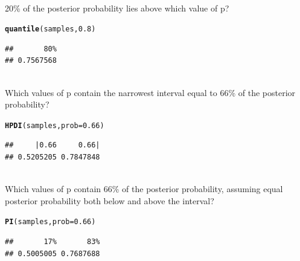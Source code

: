 \documentclass[12pt]{article}\usepackage[]{graphicx}\usepackage[]{color}
\makeatletter
\newcommand{\hlnum}[1]{\textcolor[rgb]{0.686,0.059,0.569}{#1}}%
\newcommand{\hlstd}[1]{\textcolor[rgb]{0.345,0.345,0.345}{#1}}%
\newcommand{\hlkwc}[1]{\textcolor[rgb]{0.333,0.667,0.333}{#1}}%
\newcommand{\hlkwd}[1]{\textcolor[rgb]{0.737,0.353,0.396}{\textbf{#1}}}%
\newenvironment{kframe}{%
 \def\at@end@of@kframe{}%
 \ifinner\ifhmode%
  \def\at@end@of@kframe{\end{minipage}}%
  \begin{minipage}{\columnwidth}%
 \fi\fi%
 \def\FrameCommand##1{\hskip\@totalleftmargin \hskip-\fboxsep
 \colorbox{shadecolor}{##1}\hskip-\fboxsep
     \hskip-\linewidth \hskip-\@totalleftmargin \hskip\columnwidth}%
 \MakeFramed {\advance\hsize-\width
   \@totalleftmargin\z@ \linewidth\hsize
   \@setminipage}}%
 {\par\unskip\endMakeFramed%
 \at@end@of@kframe}
\newenvironment{knitrout}{}{} %
\newenvironment{problem}[2][Problem]{\begin{trivlist}
\item[\hskip \labelsep {\bfseries #1}\hskip \labelsep {\bfseries #2.}]}{\end{trivlist}}
\makeatother
\begin{document}
\begin{problem}{3E5}
\text{}\\
20\% of the posterior probability lies above which value of p?
\end{problem}

\begin{knitrout}
\color{fgcolor}\begin{kframe}
\begin{alltt}
\hlkwd{quantile}\hlstd{(samples,} \hlnum{0.8}\hlstd{)}
\end{alltt}
\begin{verbatim}
##       80% 
## 0.7567568
\end{verbatim}
\end{kframe}
\end{knitrout}

\begin{problem}{3E6}
\text{}\\
Which values of p contain the narrowest interval equal to 66\% of the posterior probability?
\end{problem}

\begin{knitrout}
\color{fgcolor}\begin{kframe}
\begin{alltt}
\hlkwd{HPDI}\hlstd{(samples,} \hlkwc{prob} \hlstd{=} \hlnum{0.66}\hlstd{)}
\end{alltt}
\begin{verbatim}
##     |0.66     0.66| 
## 0.5205205 0.7847848
\end{verbatim}
\end{kframe}
\end{knitrout}

\begin{problem}{3E7}
\text{}\\
Which values of p contain 66\% of the posterior probability, assuming equal posterior probability both below and above the interval?
\end{problem}

\begin{knitrout}
\color{fgcolor}\begin{kframe}
\begin{alltt}
\hlkwd{PI}\hlstd{(samples,} \hlkwc{prob} \hlstd{=} \hlnum{0.66}\hlstd{)}
\end{alltt}
\begin{verbatim}
##       17%       83% 
## 0.5005005 0.7687688
\end{verbatim}
\end{kframe}
\end{knitrout}
\end{document}
